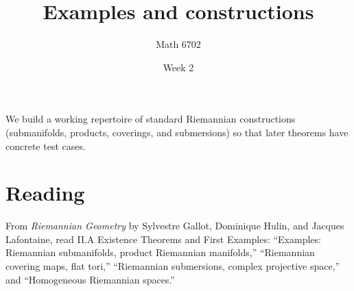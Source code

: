 \documentclass{article}
\title{Examples and constructions}
\author{Math 6702}
\date{Week 2}
\begin{document}
\maketitle

We build a working repertoire of standard Riemannian constructions (submanifolds, products, coverings, and submersions) so that later theorems have concrete test cases.

\section*{Reading}
From \textit{Riemannian Geometry} by Sylvestre Gallot, Dominique Hulin, and Jacques Lafontaine, read \textsection II.A Existence Theorems and First Examples: ``Examples: Riemannian submanifolds, product Riemannian manifolds,'' ``Riemannian covering maps, flat tori,'' ``Riemannian submersions, complex projective space,'' and ``Homogeneous Riemannian spaces.''
\end{document}
